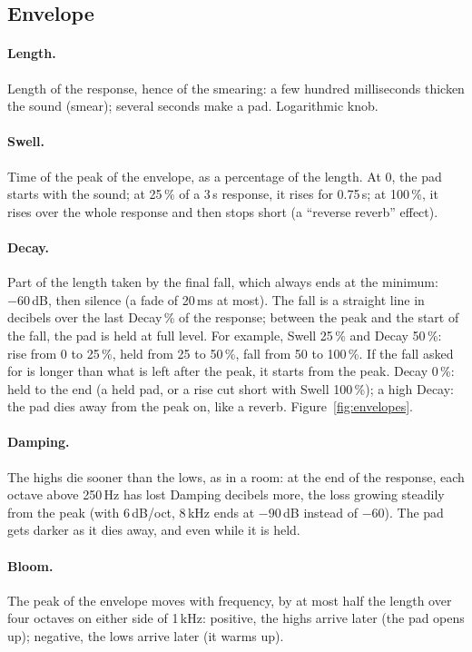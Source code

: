 \documentclass[a4paper,11pt]{article}
\newcommand{\dB}{\,dB}
\begin{document}
\subsection{Envelope}

\paragraph{Length.} Length of the response, hence of the smearing: a few hundred milliseconds
thicken the sound (smear); several seconds make a pad. Logarithmic knob.

\paragraph{Swell.} Time of the peak of the envelope, as a percentage of the length. At 0, the pad
starts with the sound; at 25\,\% of a 3\,s response, it rises for 0.75\,s; at 100\,\%, it rises over
the whole response and then stops short (a ``reverse reverb'' effect).

\paragraph{Decay.} Part of the length taken by the final fall, which always ends at the minimum:
$-60$\dB, then silence (a fade of 20\,ms at most). The fall is a straight line in decibels over the
last Decay\,\% of the response; between the peak and the start of the fall, the pad is held at full
level. For example, Swell 25\,\% and Decay 50\,\%: rise from 0 to 25\,\%, held from 25 to 50\,\%,
fall from 50 to 100\,\%. If the fall asked for is longer than what is left after the peak, it starts
from the peak. Decay 0\,\%: held to the end (a held pad, or a rise cut short with Swell 100\,\%);
a high Decay: the pad dies away from the peak on, like a reverb. Figure~\ref{fig:envelopes}.

\paragraph{Damping.} The highs die sooner than the lows, as in a room: at the end of the response,
each octave above 250\,Hz has lost Damping decibels more, the loss growing steadily from the peak
(with 6\dB/oct, 8\,kHz ends at $-90$\dB{} instead of $-60$). The pad gets darker as it dies away,
and even while it is held.

\paragraph{Bloom.} The peak of the envelope moves with frequency, by at most half the length over
four octaves on either side of 1\,kHz: positive, the highs arrive later (the pad opens up);
negative, the lows arrive later (it warms up).
\end{document}
